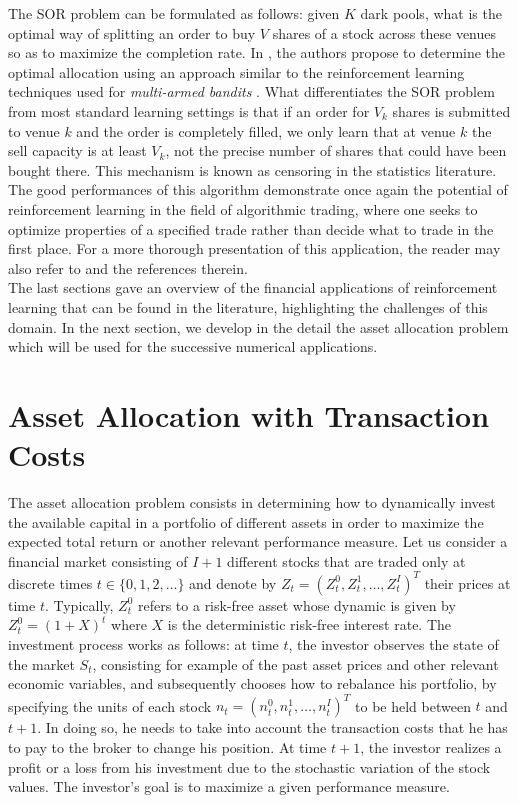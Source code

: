 The SOR problem can be formulated as follows: given $K$ dark pools, what is the optimal way of splitting an order to buy $V$ shares of a stock across these venues so as to maximize the completion rate. In \cite{ganchev2010censored}, the authors propose to determine the optimal allocation using an approach similar to the reinforcement learning techniques used for \emph{multi-armed bandits} \cite{gittins2011multi}. What differentiates the SOR problem from most standard learning settings is that if an order for $V_k$ shares is submitted to venue $k$ and the order is completely filled, we only learn that at venue $k$ the sell capacity is at least $V_k$, not the precise number of shares that could have been bought there. This mechanism is known as censoring in the statistics literature. The good performances of this algorithm demonstrate once again the potential of reinforcement learning in the field of algorithmic trading, where one seeks to optimize properties of a specified trade rather than decide what to trade in the first place. For a more thorough presentation of this application, the reader may also refer to \cite{kearns2013machine} and the references therein.\\
The last sections gave an overview of the financial applications of reinforcement learning that can be found in the literature, highlighting the challenges of this domain. In the next section, we develop in the detail the asset allocation problem which will be used for the successive numerical applications.


\section{Asset Allocation with Transaction Costs}
\label{sec:asset_allocation_with_transaction_costs}

The asset allocation problem consists in determining how to dynamically invest the available capital in a portfolio of different assets in order to maximize the expected total return or another relevant performance measure. Let us consider a financial market consisting of $I+1$ different stocks that are traded only at discrete times $t \in \{0, 1, 2, \ldots\}$ and denote by ${Z}_t = {(Z_t^0, Z_t^1, \ldots, Z_t^I)}^T$ their prices at time $t$. Typically, $Z_t^0$ refers to a risk-free asset whose dynamic is given by $Z_t^0 = {(1 + X)}^t$ where $X$ is the deterministic risk-free interest rate. The investment process works as follows: at time $t$, the investor observes the state of the market $S_t$, consisting for example of the past asset prices and other relevant economic variables, and subsequently chooses how to rebalance his portfolio, by specifying the units of each stock ${n}_t = {(n_t^0 , n_t^1 , \ldots , n_t^I)}^T$ to be held between $t$ and $t+1$. In doing so, he needs to take into account the transaction costs that he has to pay to the broker to change his position.  At time $t+1$, the investor realizes a profit or a loss from his investment due to the stochastic variation of the stock values. The investor's goal is to maximize a given performance measure.

